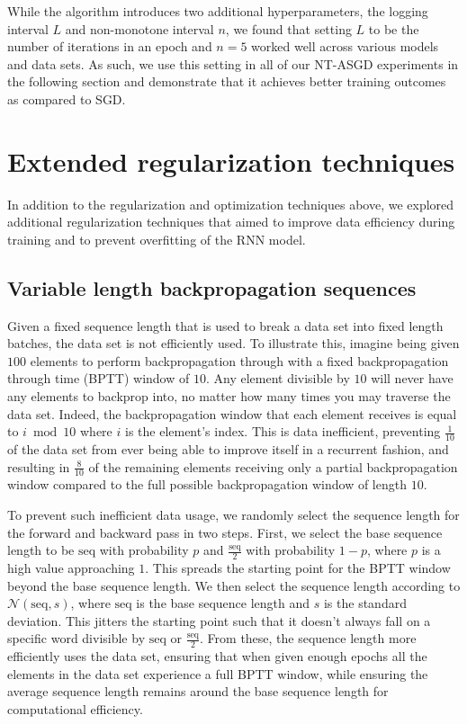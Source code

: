 \documentclass{article}
\begin{document}
While the algorithm introduces two additional hyperparameters, the logging interval $L$ and non-monotone interval $n$, we found that setting $L$ to be the number of iterations in an epoch and $n=5$ worked well across various models and data sets. As such, we use this setting in all of our NT-ASGD experiments in the following section and demonstrate that it achieves better training outcomes as compared to SGD.

\section{Extended regularization techniques}

In addition to the regularization and optimization techniques above, we explored additional regularization techniques that aimed to improve data efficiency during training and to prevent overfitting of the RNN model.

\subsection{Variable length backpropagation sequences}

Given a fixed sequence length that is used to break a data set into fixed length batches, the data set is not efficiently used.
To illustrate this, imagine being given $100$ elements to perform backpropagation through with a fixed backpropagation through time (BPTT) window of $10$.
Any element divisible by $10$ will never have any elements to backprop into, no matter how many times you may traverse the data set.
Indeed, the backpropagation window that each element receives is equal to $i \bmod 10$ where $i$ is the element's index.
This is data inefficient, preventing $\frac{1}{10}$ of the data set from ever being able to improve itself in a recurrent fashion, and resulting in $\frac{8}{10}$ of the remaining elements receiving only a partial backpropagation window compared to the full possible backpropagation window of length $10$.

To prevent such inefficient data usage, we randomly select the sequence length for the forward and backward pass in two steps.
First, we select the base sequence length to be $\text{seq}$ with probability $p$ and $\frac{\text{seq}}{2}$ with probability $1-p$, where $p$ is a high value approaching $1$.
This spreads the starting point for the BPTT window beyond the base sequence length.
We then select the sequence length according to $\mathcal{N}(\text{seq}, s)$, where $\text{seq}$ is the base sequence length and $s$ is the standard deviation.
This jitters the starting point such that it doesn't always fall on a specific word divisible by $\text{seq}$ or $\frac{\text{seq}}{2}$.
From these, the sequence length more efficiently uses the data set, ensuring that when given enough epochs all the elements in the data set experience a full BPTT window, while ensuring the average sequence length remains around the base sequence length for computational efficiency.
\end{document}
